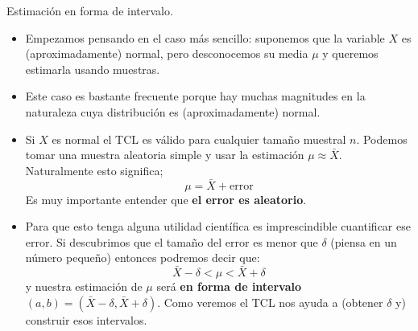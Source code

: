 \documentclass[
  9pt,
  ignorenonframetext,
]{beamer}
\begin{document}
\begin{frame}{Estimación en forma de intervalo.}
\protect\hypertarget{estimacion-en-forma-de-intervalo.}{}

\begin{itemize}
\item
  Empezamos pensando en el caso más sencillo: suponemos que la variable
  \(X\) es (aproximadamente) normal, pero desconocemos su media \(\mu\)
  y queremos estimarla usando muestras.
\item
  Este caso es bastante frecuente porque hay muchas magnitudes en la
  naturaleza cuya distribución es (aproximadamente) normal.
\item
  Si \(X\) es normal el TCL es válido para cualquier tamaño muestral
  \(n\). Podemos tomar una muestra aleatoria simple y usar la estimación
  \(\mu\approx\bar X\). Naturalmente esto significa; \[
  \mu = \bar X + \text{error}
  \] Es muy importante entender que \textbf{el error es aleatorio}.
\item
  Para que esto tenga alguna utilidad científica es imprescindible
  cuantificar ese error. Si descubrimos que el tamaño del error es menor
  que \(\delta\) (piensa en un número pequeño) entonces podremos decir
  que: \[
  \bar X - \delta < \mu < \bar X + \delta
  \] y nuestra estimación de \(\mu\) será \textbf{en forma de intervalo}
  \((a, b) = (\bar X - \delta, \bar X + \delta)\). Como veremos el TCL
  nos ayuda a (obtener \(\delta\) y) construir esos intervalos.
\end{itemize}

\end{frame}
\end{document}
